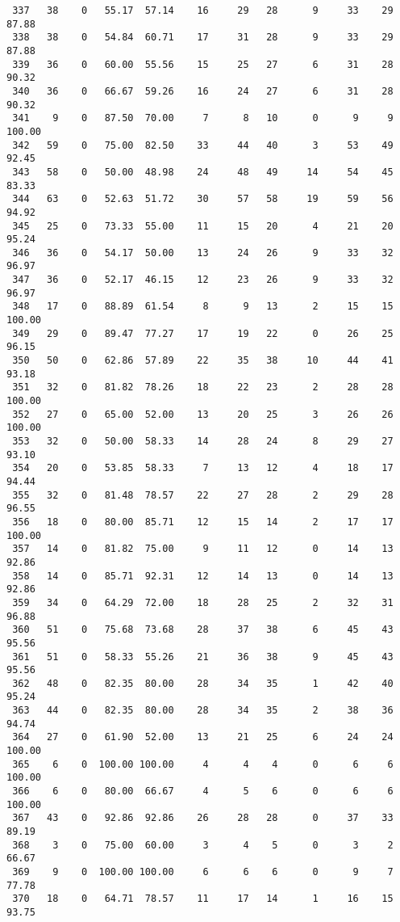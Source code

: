 \begin{verbatim}
 337   38    0   55.17  57.14    16     29   28      9     33    29    87.88
 338   38    0   54.84  60.71    17     31   28      9     33    29    87.88
 339   36    0   60.00  55.56    15     25   27      6     31    28    90.32
 340   36    0   66.67  59.26    16     24   27      6     31    28    90.32
 341    9    0   87.50  70.00     7      8   10      0      9     9   100.00
 342   59    0   75.00  82.50    33     44   40      3     53    49    92.45
 343   58    0   50.00  48.98    24     48   49     14     54    45    83.33
 344   63    0   52.63  51.72    30     57   58     19     59    56    94.92
 345   25    0   73.33  55.00    11     15   20      4     21    20    95.24
 346   36    0   54.17  50.00    13     24   26      9     33    32    96.97
 347   36    0   52.17  46.15    12     23   26      9     33    32    96.97
 348   17    0   88.89  61.54     8      9   13      2     15    15   100.00
 349   29    0   89.47  77.27    17     19   22      0     26    25    96.15
 350   50    0   62.86  57.89    22     35   38     10     44    41    93.18
 351   32    0   81.82  78.26    18     22   23      2     28    28   100.00
 352   27    0   65.00  52.00    13     20   25      3     26    26   100.00
 353   32    0   50.00  58.33    14     28   24      8     29    27    93.10
 354   20    0   53.85  58.33     7     13   12      4     18    17    94.44
 355   32    0   81.48  78.57    22     27   28      2     29    28    96.55
 356   18    0   80.00  85.71    12     15   14      2     17    17   100.00
 357   14    0   81.82  75.00     9     11   12      0     14    13    92.86
 358   14    0   85.71  92.31    12     14   13      0     14    13    92.86
 359   34    0   64.29  72.00    18     28   25      2     32    31    96.88
 360   51    0   75.68  73.68    28     37   38      6     45    43    95.56
 361   51    0   58.33  55.26    21     36   38      9     45    43    95.56
 362   48    0   82.35  80.00    28     34   35      1     42    40    95.24
 363   44    0   82.35  80.00    28     34   35      2     38    36    94.74
 364   27    0   61.90  52.00    13     21   25      6     24    24   100.00
 365    6    0  100.00 100.00     4      4    4      0      6     6   100.00
 366    6    0   80.00  66.67     4      5    6      0      6     6   100.00
 367   43    0   92.86  92.86    26     28   28      0     37    33    89.19
 368    3    0   75.00  60.00     3      4    5      0      3     2    66.67
 369    9    0  100.00 100.00     6      6    6      0      9     7    77.78
 370   18    0   64.71  78.57    11     17   14      1     16    15    93.75

\end{verbatim}
